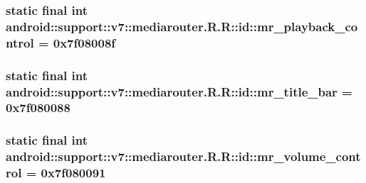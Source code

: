 \hypertarget{classandroid_1_1support_1_1v7_1_1mediarouter_1_1_r_1_1id_0f577f64b4dadb0a77b39dfc576413f5}{
\subsubsection[{mr\_\-playback\_\-control}]{\setlength{\rightskip}{0pt plus 5cm}static final int android::support::v7::mediarouter.R.R::id::mr\_\-playback\_\-control = 0x7f08008f}}
\label{classandroid_1_1support_1_1v7_1_1mediarouter_1_1_r_1_1id_0f577f64b4dadb0a77b39dfc576413f5}


\hypertarget{classandroid_1_1support_1_1v7_1_1mediarouter_1_1_r_1_1id_5b33ba6264ca2cc3f97e3129b2601df5}{
\subsubsection[{mr\_\-title\_\-bar}]{\setlength{\rightskip}{0pt plus 5cm}static final int android::support::v7::mediarouter.R.R::id::mr\_\-title\_\-bar = 0x7f080088}}
\label{classandroid_1_1support_1_1v7_1_1mediarouter_1_1_r_1_1id_5b33ba6264ca2cc3f97e3129b2601df5}


\hypertarget{classandroid_1_1support_1_1v7_1_1mediarouter_1_1_r_1_1id_dc5f92fbd99e4701ca366fef26d6747e}{
\subsubsection[{mr\_\-volume\_\-control}]{\setlength{\rightskip}{0pt plus 5cm}static final int android::support::v7::mediarouter.R.R::id::mr\_\-volume\_\-control = 0x7f080091}}
\label{classandroid_1_1support_1_1v7_1_1mediarouter_1_1_r_1_1id_dc5f92fbd99e4701ca366fef26d6747e}


